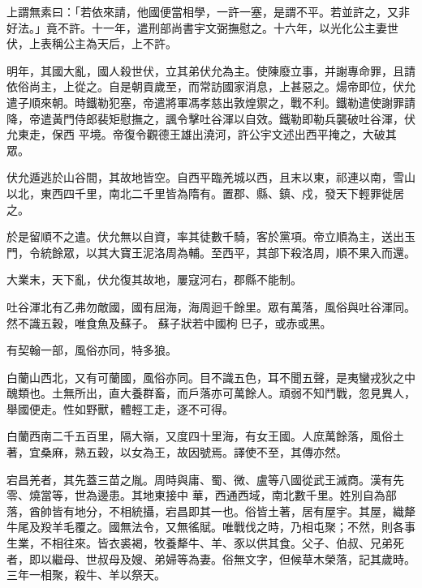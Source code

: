 \begin{pinyinscope}
 上謂無素曰：「若依來請，他國便當相學，一許一塞，是謂不平。若並許之，又非好法。」竟不許。十一年，遣刑部尚書宇文弼撫慰之。十六年，以光化公主妻世伏，上表稱公主為天后，上不許。



 明年，其國大亂，國人殺世伏，立其弟伏允為主。使陳廢立事，并謝專命罪，且請依俗尚主，上從之。自是朝貢歲至，而常訪國家消息，上甚惡之。煬帝即位，伏允遣子順來朝。時鐵勒犯塞，帝遣將軍馮孝慈出敦煌禦之，戰不利。鐵勒遣使謝罪請降，帝遣黃門侍郎裴矩慰撫之，諷令擊吐谷渾以自效。鐵勒即勒兵襲破吐谷渾，伏允東走，保西
 平境。帝復令觀德王雄出澆河，許公宇文述出西平掩之，大破其眾。



 伏允遁逃於山谷間，其故地皆空。自西平臨羌城以西，且末以東，祁連以南，雪山以北，東西四千里，南北二千里皆為隋有。置郡、縣、鎮、戍，發天下輕罪徙居之。



 於是留順不之遣。伏允無以自資，率其徒數千騎，客於黨項。帝立順為主，送出玉門，令統餘眾，以其大寶王泥洛周為輔。至西平，其部下殺洛周，順不果入而還。



 大業末，天下亂，伏允復其故地，屢寇河右，郡縣不能制。



 吐谷渾北有乙弗勿敵國，國有屈海，海周迴千餘里。眾有萬落，風俗與吐谷渾同。然不識五穀，唯食魚及蘇子。
 蘇子狀若中國枸巳子，或赤或黑。



 有契翰一部，風俗亦同，特多狼。



 白蘭山西北，又有可蘭國，風俗亦同。目不識五色，耳不聞五聲，是夷蠻戎狄之中醜類也。土無所出，直大養群畜，而戶落亦可萬餘人。頑弱不知鬥戰，忽見異人，舉國便走。性如野獸，體輕工走，逐不可得。



 白蘭西南二千五百里，隔大嶺，又度四十里海，有女王國。人庶萬餘落，風俗土著，宜桑麻，熟五穀，以女為王，故因號焉。譯使不至，其傳亦然。



 宕昌羌者，其先蓋三苗之胤。周時與庸、蜀、微、盧等八國從武王滅商。漢有先零、燒當等，世為邊患。其地東接中
 華，西通西域，南北數千里。姓別自為部落，酋帥皆有地分，不相統攝，宕昌即其一也。俗皆土著，居有屋宇。其屋，織犛牛尾及羖羊毛覆之。國無法令，又無徭賦。唯戰伐之時，乃相屯聚；不然，則各事生業，不相往來。皆衣裘褐，牧養犛牛、羊、豕以供其食。父子、伯叔、兄弟死者，即以繼母、世叔母及嫂、弟婦等為妻。俗無文字，但候草木榮落，記其歲時。三年一相聚，殺牛、羊以祭天。




\end{pinyinscope}
